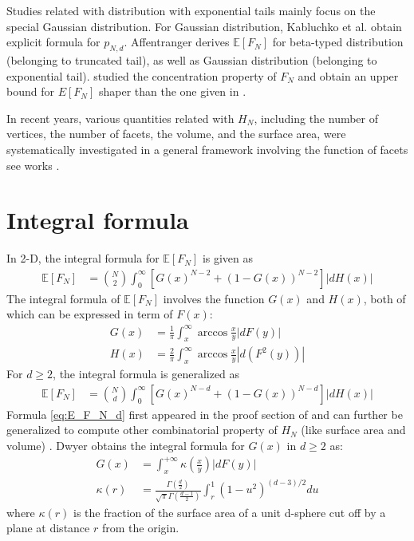 \documentclass{aptpub}
\def\E{\mathbb{E}}
\begin{document}
Studies related with distribution with exponential tails mainly focus on the special Gaussian distribution.
For Gaussian distribution, Kabluchko et al. \cite{kabluchko2020absorption} obtain explicit formula for $p_{N,d}$.
Affentranger \cite{affentranger1991convex} derives $\E[F_N]$
for beta-typed distribution (belonging to truncated tail),
as well as Gaussian distribution (belonging to exponential tail).
\cite{hueter1999limit} studied the concentration property of $F_N$ and obtain
an upper bound for $E[F_N]$ shaper than the one given in \cite{dwyer1991convex}.

In recent years, various quantities related with $H_N$, including the number of vertices, the number of facets, the volume, and the surface area,
were systematically investigated in a general framework involving the function of facets
see works \cite{schneider2008stochastic, barany2008random}.

 \section{Integral formula}\label{sec:int_f}
In 2-D, the integral formula for $\E[F_N]$ is given as \cite{carnal1970konvexe}
\begin{align}
     \E[F_N] &= \binom{N}{2} \int_0^{\infty} 
     \left[G(x)^{N-2} + (1-G(x))^{N-2} \right]|dH(x)| 
     \label{eq:E_F_N_2_d}
\end{align}
The integral formula of $\E[F_N]$ involves the function $G(x)$ and $H(x)$,
both of which can be expressed in term of $F(x)$:
\begin{align}
   G(x) &=\frac{1}{\pi} \int_x^{\infty}\arccos\frac{x}{y} |dF(y)| \\
     H(x) &= \frac{2}{\pi} \int_x^{\infty} \arccos \frac{x}{y} |d(F^2(y))|
     \label{eq:H_expression_2_dim}
\end{align}
For $d\geq 2$, the integral formula is generalized as
\begin{align}
     \E[F_N] &= \binom{N}{d} \int_0^{\infty} 
     \left[G(x)^{N-d} + (1-G(x))^{N-d} \right]|dH(x)| 
     \label{eq:E_F_N_d}
\end{align}
Formula \eqref{eq:E_F_N_d} first appeared in the proof section of \cite{raynaud1970enveloppe}
and can further be generalized to compute other combinatorial property of $H_N$ (like surface area and volume)
\cite{barany2008random}.
Dwyer obtains the integral formula for $G(x)$ in $d\geq 2$ as:
\begin{align}\label{eq:G_d_kappa}
     G(x) & = \int_x^{+\infty} \kappa \left(\frac{x}{y} \right) |dF(y)| \\
     \kappa(r) & = \frac{\Gamma(\frac{d}{2})}
     {\sqrt{\pi}\Gamma(\frac{d-1}{2})}\int_r^{1}
     (1-u^2)^{(d-3)/2}du\label{eq:kappa_r}
\end{align}
where $\kappa(r)$ is the fraction of the surface area of a unit d-sphere
cut off by a plane at distance $r$ from the origin.
\end{document}
